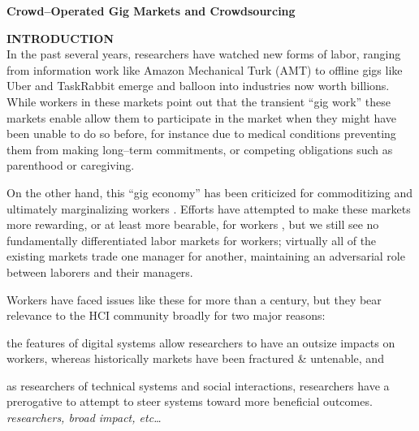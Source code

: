 \documentclass[12pt]{article}
\newcommand{\sectitle}[1]{\textbf{\MakeUppercase{#1}}}
\begin{document}
  \begin{center}
  \large{\bf Crowd--Operated Gig Markets and Crowdsourcing}
  \end{center}


\sectitle{introduction}\\
In the past several years, researchers have watched new forms of labor,
ranging from information work like Amazon Mechanical Turk (AMT)
to offline gigs like Uber and TaskRabbit emerge and balloon into industries now worth billions.
While workers in these markets point out that the transient ``gig work'' these markets enable
allow them to participate in the market when they might have been unable to do so before,
for instance due to medical conditions preventing them from making long--term commitments,
or competing obligations such as parenthood or caregiving.

On the other hand, this ``gig economy'' has been criticized for commoditizing
and ultimately marginalizing workers
\cite{uberAlgorithm}.
Efforts have attempted to make these markets more rewarding, or at least more bearable,
for workers
\cite{turkopticon,dynamo},
but we still see no fundamentally differentiated labor markets for workers;
virtually all of the existing markets trade one manager for another, maintaining an adversarial role between laborers and their managers.

Workers have faced issues like these for more than a century,
but they bear relevance to the HCI community broadly for two major reasons:
\begin{inlinelist}
  \item the features of digital systems allow researchers to have an outsize impacts on workers,
  whereas historically markets have been fractured \& untenable,
  and
  \item as researchers of technical systems and social interactions,
  researchers have a prerogative to attempt to steer systems toward more beneficial outcomes.
  \textit{researchers, broad impact, etc\dots}
\end{inlinelist}
\end{document}
